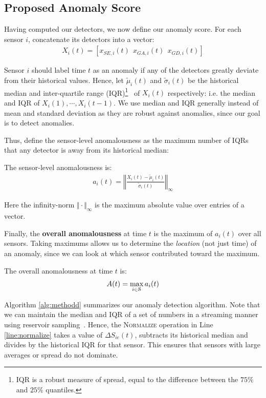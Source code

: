 \subsection{Proposed Anomaly Score}

Having computed our detectors, we now define our anomaly score. For each sensor $i$, concatenate its detectors into a vector:
\begin{align}\label{eq:sensor_vector}
X_i(t) = [x_{SE,i}(t) \ \  x_{GA,i}(t) \ \ x_{GD,i}(t)]
\end{align}

Sensor $i$ should label time $t$ as an anomaly if any of the detectors greatly deviate from their historical values. Hence, let $\tilde{\mu}_i(t)$ and $\tilde{\sigma}_i(t)$ be the historical median and inter-quartile range (IQR)\footnote{IQR is a robust measure of spread, equal to the difference between the $75\%$ and $25\%$ quantiles.}~\cite{yule1919introduction} of $X_i(t)$ respectively: i.e. the median and IQR of $X_i(1), \cdots, X_i(t-1)$. We use median and IQR generally instead of mean and standard deviation as they are robust against anomalies, since our goal is to detect anomalies. 

Thus, define the sensor-level anomalousness as the maximum number of IQRs that any detector is away from its historical median: 
\begin{definition} \label{dfn:sensorlevel}
The sensor-level anomalousness is:
\begin{align}
a_{i}(t) = \left\Vert \frac{X_i(t) - \tilde{\mu}_i(t)}{ \tilde{\sigma}_i(t)} \right\Vert_\infty
\end{align}
\end{definition}
Here the infinity-norm $\Vert\cdot\Vert_\infty$ is the maximum absolute value over entries of a vector.

Finally, the {\bf overall anomalousness} at time $t$ is the maximum of $a_i(t)$ over all sensors. Taking maximums allows us to determine the {\it location} (not just time) of an anomaly, since we can look at which sensor contributed toward the maximum. 

\begin{definition}\label{dfn:overall}
The overall anomalousness at time $t$ is:
\begin{align}
A(t) = \max_{i\in \S} a_{i}(t)
\end{align}
\end{definition}

Algorithm \ref{alg:methodd} summarizes our \methodD anomaly detection algorithm. Note that we can maintain the median and IQR of a set of numbers in a streaming manner using reservoir sampling~\cite{vitter1985random}. Hence, the \textsc{Normalize} operation in Line \ref{line:normalize} takes a value of $\Delta S_{ie}(t)$, subtracts its historical median and divides by the historical IQR for that sensor. This ensures that sensors with large averages or spread do not dominate.

